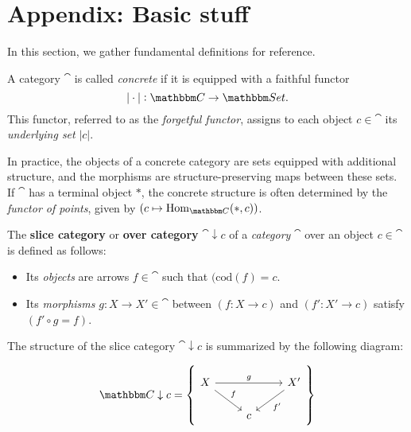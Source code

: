 \documentclass[a4paper,11pt]{article}  %
\begin{document}
\clearpage
\appendix
\section*{Appendix: Basic stuff}
%
In this section, we gather fundamental definitions for reference.
%
\begin{definition}\label{def:concrete_cat}
A category $\cat$ is called \emph{concrete} if it is equipped with a faithful functor 
$$
|\cdot| : \cat \to \Set.
$$
This functor, referred to as the \emph{forgetful functor}, assigns to each object $c \in \cat$ its \emph{underlying set} \(|c|\).
\end{definition}

\begin{remark}\label{rem:concrete_terminal}
	In practice, the objects of a concrete category are sets equipped with additional structure, and the morphisms are structure-preserving maps between these sets.\\
	If $\cat$  has a terminal object $*$, the concrete structure is often determined by the \emph{functor of points}, given by $(c \mapsto \Hom_{\cat} (*, c))$.
\end{remark}

\begin{definition}\label{def:overcat}
The \textbf{slice category} or \textbf{over category} $\cat \downarrow c$  of a \emph{category} $\cat$ over an object $c\in\cat$  is defined as follows:

\begin{itemize}
    \item Its \emph{objects} are arrows $f\in\cat$  such that $(\mathrm{cod}(f) = c$.
    \item Its \emph{morphisms} $g: X \to X' \in \cat $ between $(f: X \to c)$ and $(f': X' \to c)$ satisfy $(f' \circ g = f)$.
\end{itemize}

The structure of the slice category $\cat \downarrow c$ is summarized by the following diagram:

\begin{displaymath}
	\cat \downarrow c =
	\left\lbrace
		\begin{tikzcd}
			X \ar[rr,"g"] \ar[dr,"f"] && X' \ar[dl,"f'"] \\
			&c&
		\end{tikzcd}
	\right\rbrace
\end{displaymath}
\end{definition}
\end{document}
